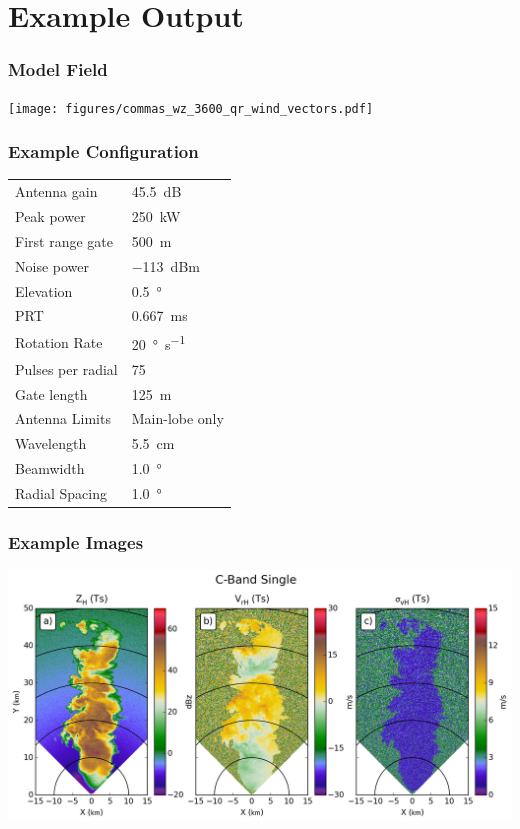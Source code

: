 \documentclass[red]{beamer}
\begin{document}
\section{Example Output}
\begin{frame}
	\frametitle{Model Field}
	\begin{center}
		\texttt{[image: figures/commas\_wz\_3600\_qr\_wind\_vectors.pdf]}	
	\end{center}
\end{frame}

\begin{frame}
	\frametitle{Example Configuration}
	\begin{center}
	    \begin{tabular}{ | l | l | }
	        \hline
	        Antenna gain & \SI{45.5}{dB} \\
	        Peak power & \SI{250}{\kilo\watt} \\
	        First range gate & \SI{500}{\meter} \\
	        Noise power & \SI{-113}{dBm} \\
	        Elevation & \SI{0.5}{\degree} \\
	        PRT & \SI{0.667}{\milli\second} \\
	        Rotation Rate & \SI{20}{\degree\per\second} \\
	        Pulses per radial & \num{75} \\
	        Gate length & \SI{125}{\meter} \\
	        Antenna Limits & Main-lobe only \\
			Wavelength &  \SI{5.5}{\centi\meter} \\
			Beamwidth & \SI{1.0}{\degree} \\
			Radial Spacing & \SI{1.0}{\degree} \\
			\hline
	    \end{tabular}
	\end{center}
\end{frame}

\begin{frame}
	\frametitle{Example Images}
	\includegraphics[scale=0.4]{figures/C_Single.png}
\end{frame}
\end{document}
